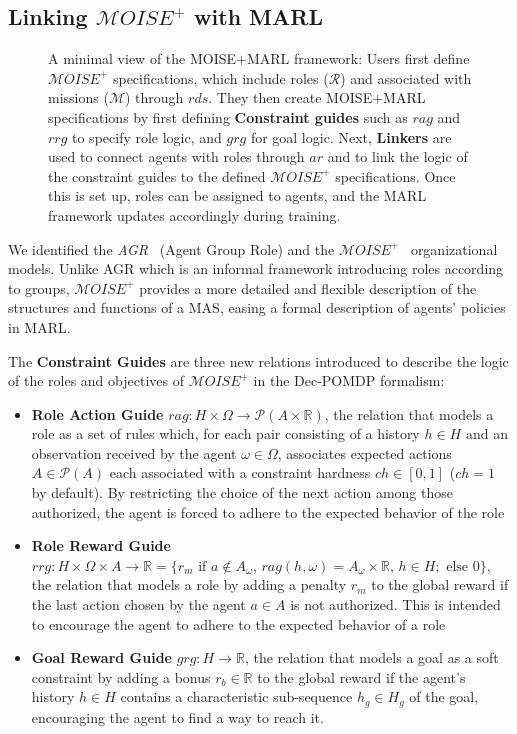 \documentclass[sigconf,anonymous]{aamas}
\begin{document}
\subsection{Linking $\mathcal{M}OISE^+$ with MARL}

\begin{figure}[h!]
    \centering
    
    \caption{A minimal view of the MOISE+MARL framework: 
    Users first define $\mathcal{M}OISE^+$ specifications, which include roles ($\mathcal{R}$) and associated with missions ($\mathcal{M}$) through $rds$. They then create MOISE+MARL specifications by first defining \textbf{Constraint guides} such as $rag$ and $rrg$ to specify role logic, and $grg$ for goal logic. 
    Next, \textbf{Linkers} are used to connect agents with roles through $ar$ and to link the logic of the constraint guides to the defined $\mathcal{M}OISE^+$ specifications. Once this is set up, roles can be assigned to agents, and the MARL framework updates accordingly during training.
    }
    \label{fig:mm_synthesis}
\end{figure}

We identified the \textit{AGR}~\cite{ferber2003} (Agent Group Role) and the $\mathcal{M}OISE^+$~\citep{Hubner2007} organizational models. Unlike AGR which is an informal framework introducing roles according to groups, $\mathcal{M}OISE^+$ provides a more detailed and flexible description of the structures and functions of a MAS, easing a formal description of agents' policies in MARL.

\noindent The \textbf{Constraint Guides} are three new relations introduced to describe the logic of the roles and objectives of $\mathcal{M}OISE^+$ in the Dec-POMDP formalism:
%
\begin{itemize}
    \item \textbf{Role Action Guide} \quad $rag: H \times \Omega \rightarrow \mathcal{P}(A \times \mathbb{R})$, the relation that models a role as a set of rules which, for each pair consisting of a history $h \in H$ and an observation received by the agent $\omega \in \Omega$, associates expected actions $A \in \mathcal{P}(A)$ each associated with a constraint hardness $ch \in [0,1]$ ($ch = 1$ by default). By restricting the choice of the next action among those authorized, the agent is forced to adhere to the expected behavior of the role
    \item \textbf{Role Reward Guide} \quad $rrg: H \times \Omega \times A \to \mathbb{R} = \{r_m \text{ if } a \notin A_\omega \text{, } rag(h, \omega) = A_\omega \times \mathbb{R} \text{, } h \in H; \text{ else } 0\}$, the relation that models a role by adding a penalty $r_m$ to the global reward if the last action chosen by the agent $a \in A$ is not authorized. This is intended to encourage the agent to adhere to the expected behavior of a role
    \item \textbf{Goal Reward Guide} \quad $grg: H \rightarrow \mathbb{R}$, the relation that models a goal as a soft constraint by adding a bonus $r_b \in \mathbb{R}$ to the global reward if the agent's history $h \in H$ contains a characteristic sub-sequence $h_g \in H_g$ of the goal, encouraging the agent to find a way to reach it.
\end{itemize}
\end{document}
